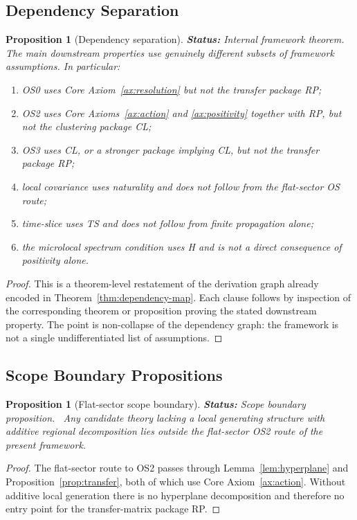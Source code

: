 \documentclass[12pt,a4paper]{article}
\theoremstyle{plain}
\newtheorem{proposition}[theorem]{Proposition}
\theoremstyle{definition}
\theoremstyle{remark}
\newcommand{\status}[1]{\textnormal{\textbf{Status:} #1.}\ }
\begin{document}
\subsection{Dependency Separation}

\begin{proposition}[Dependency separation]
  \label{prop:dependency-separation}
  \status{Internal framework theorem}
  The main downstream properties use genuinely different subsets of
  framework assumptions. In particular:
  \begin{enumerate}[nosep,label=(\roman*)]
  \item OS0 uses Core Axiom~\ref{ax:resolution} but not the transfer
    package RP;
  \item OS2 uses Core Axioms~\ref{ax:action} and
    \ref{ax:positivity} together with RP, but not the clustering
    package CL;
  \item OS3 uses CL, or a stronger package implying CL, but not the
    transfer package RP;
  \item local covariance uses naturality and does not follow from the
    flat-sector OS route;
  \item time-slice uses TS and does not follow from finite propagation
    alone;
  \item the microlocal spectrum condition uses H and is not a direct
    consequence of positivity alone.
  \end{enumerate}
\end{proposition}
\begin{proof}
  This is a theorem-level restatement of the derivation graph already
  encoded in Theorem~\ref{thm:dependency-map}. Each clause follows by
  inspection of the corresponding theorem or proposition proving the
  stated downstream property. The point is non-collapse of the
  dependency graph: the framework is not a single undifferentiated list
  of assumptions.
\end{proof}

\subsection{Scope Boundary Propositions}

\begin{proposition}[Flat-sector scope boundary]
  \label{prop:scope-flat}
  \status{Scope boundary proposition}
  Any candidate theory lacking a local generating structure with
  additive regional decomposition lies outside the flat-sector OS2
  route of the present framework.
\end{proposition}
\begin{proof}
  The flat-sector route to OS2 passes through
  Lemma~\ref{lem:hyperplane} and Proposition~\ref{prop:transfer}, both
  of which use Core Axiom~\ref{ax:action}. Without additive local
  generation there is no hyperplane decomposition and therefore no
  entry point for the transfer-matrix package RP.
\end{proof}
\end{document}
